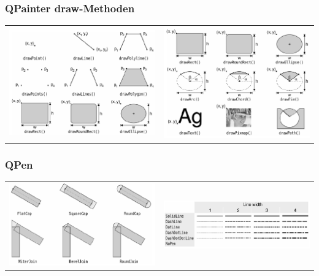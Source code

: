 \subsubsection{QPainter draw-Methoden}
\begin{tabular}{c c}
	\includegraphics[width=9cm]{images/draw_1.png}& \includegraphics[width=9cm]{images/draw_2.png}\\
\end{tabular}
\subsubsection{QPen}
\begin{tabular}{c c}
	\includegraphics[width=9cm]{images/pen_1.png}& \includegraphics[width=9cm]{images/pen_2.png}\\
\end{tabular}

